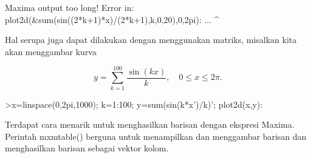 \documentclass{article}
\begin{document}
\begin{eulernotebook}
\begin{eulercomment}
\begin{eulercomment}
\begin{eulercomment}
\begin{eulercomment}
\begin{eulercomment}
\begin{eulercomment}
\begin{eulercomment}
\begin{eulercomment}
\begin{eulercomment}
\begin{eulercomment}
\begin{eulercomment}
\begin{eulercomment}
\begin{eulercomment}
\begin{eulercomment}
\begin{eulercomment}
\begin{eulercomment}
\begin{eulercomment}
\begin{eulercomment}
\begin{eulercomment}
\begin{eulercomment}
\begin{eulercomment}
\begin{eulercomment}
\begin{eulercomment}
\begin{eulercomment}
\begin{eulercomment}
\begin{eulercomment}
\begin{eulercomment}
\begin{eulercomment}
\begin{eulercomment}
\begin{eulercomment}
\begin{eulercomment}
\begin{eulercomment}
\begin{eulercomment}
\begin{eulercomment}
\begin{eulercomment}
\begin{eulercomment}
\begin{eulercomment}
\begin{eulercomment}
\begin{euleroutput}
  Maxima output too long!
  Error in:
  plot2d(&sum(sin((2*k+1)*x)/(2*k+1),k,0,20),0,2pi): ...
                                            ^
\end{euleroutput}
\begin{eulercomment}
Hal serupa juga dapat dilakukan dengan menggunakan matriks, misalkan
kita akan menggambar kurva

\end{eulercomment}
\begin{eulerformula}
\[
y = \sum_{k=1}^{100} \dfrac{\sin(kx)}{k},\quad 0\le x\le 2\pi.
\]
\end{eulerformula}
\begin{eulerprompt}
>x=linspace(0,2pi,1000); k=1:100; y=sum(sin(k*x')/k)'; plot2d(x,y):
\end{eulerprompt}
\begin{eulercomment}
\begin{eulercomment}
\begin{eulercomment}
Terdapat cara menarik untuk menghasilkan barisan dengan ekspresi
Maxima. Perintah mxmtable() berguna untuk menampilkan dan menggambar
barisan dan menghasilkan barisan sebagai vektor kolom. 


\end{eulercomment}
\end{eulercomment}
\end{eulercomment}
\end{eulercomment}
\end{eulercomment}
\end{eulercomment}
\end{eulercomment}
\end{eulercomment}
\end{eulercomment}
\end{eulercomment}
\end{eulercomment}
\end{eulercomment}
\end{eulercomment}
\end{eulercomment}
\end{eulercomment}
\end{eulercomment}
\end{eulercomment}
\end{eulercomment}
\end{eulercomment}
\end{eulercomment}
\end{eulercomment}
\end{eulercomment}
\end{eulercomment}
\end{eulercomment}
\end{eulercomment}
\end{eulercomment}
\end{eulercomment}
\end{eulercomment}
\end{eulercomment}
\end{eulercomment}
\end{eulercomment}
\end{eulercomment}
\end{eulercomment}
\end{eulercomment}
\end{eulercomment}
\end{eulercomment}
\end{eulercomment}
\end{eulercomment}
\end{eulercomment}
\end{eulercomment}
\end{eulercomment}
\end{eulernotebook}
\end{document}

